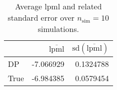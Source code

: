 \begin{table}[H]

\caption{Average lpml and related standard error over $n_{\text{sim}} = 10$ simulations.}
\centering
\begin{tabular}[t]{lrr}
\toprule
  & $\overbar{\text{lpml}}$ & $\text{sd}(\overbar{\text{lpml}})$\\
\midrule
DP & -7.066929 & 0.1324788\\
True & -6.984385 & 0.0579454\\
\bottomrule
\end{tabular}
\end{table}